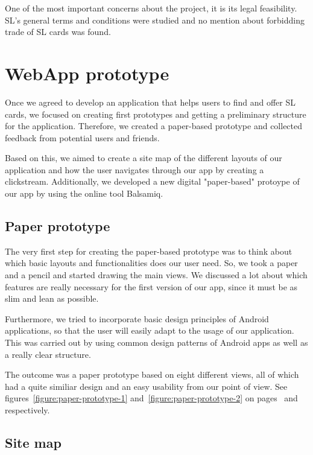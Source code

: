 \documentclass[11pt,twoside,a4paper]{report}
\begin{document}
One of the most important concerns about the project, it is its legal feasibility. SL's general terms and conditions were studied and no mention about forbidding trade of SL cards was found.

\chapter{WebApp prototype}

Once we agreed to develop an application that helps users to find and offer SL cards, we focused on creating first prototypes and getting a preliminary structure for the application. Therefore, we created a paper-based prototype and collected feedback from potential users and friends.

Based on this, we aimed to create a site map of the different layouts of our application and how the user navigates through our app by creating a clickstream. Additionally, we developed a new digital "paper-based" protoype of our app by using the online tool Balsamiq.

\section{Paper prototype}

The very first step for creating the paper-based prototype was to think about which basic layouts and functionalities does our user need. So, we took a paper and a pencil and started drawing the main views. We discussed a lot about which features are really necessary for the first version of our app, since it must be as slim and lean as possible.

Furthermore, we tried to incorporate basic design principles of Android applications, so that the user will easily adapt to the usage of our application. This was carried out by using common design patterns of Android apps as well as a really clear structure.

The outcome was a paper prototype based on eight different views, all of which had a quite similiar design and an easy usability from our point of view. See figures~\ref{figure:paper-prototype-1} and~\ref{figure:paper-prototype-2} on pages~\pageref{figure:paper-prototype-1} and~\pageref{figure:paper-prototype-2} respectively.

\section{Site map}
\end{document}
